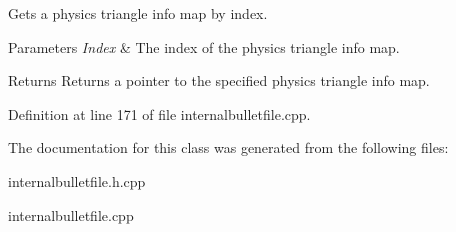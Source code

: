 Gets a physics triangle info map by index. 


\begin{DoxyParams}{Parameters}
{\em Index} & The index of the physics triangle info map. \\
\hline
\end{DoxyParams}
\begin{DoxyReturn}{Returns}
Returns a pointer to the specified physics triangle info map. 
\end{DoxyReturn}


Definition at line 171 of file internalbulletfile.cpp.



The documentation for this class was generated from the following files:\begin{DoxyCompactItemize}
\item 
internalbulletfile.h.cpp\item 
internalbulletfile.cpp\end{DoxyCompactItemize}
